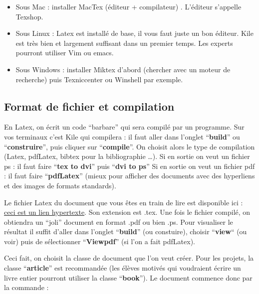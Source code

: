 \documentclass[a4paper,10pt]{article}
\begin{document}
\begin{itemize}
\item Sous Mac : installer MacTex  (éditeur + compilateur) . L'éditeur s'appelle Texshop.  
\item Sous Linux : Latex est installé de base, il vous faut juste un bon éditeur. Kile est très bien et largement suffisant
dans un premier temps. Les experts pourront utiliser Vim ou emacs. 
\item Sous Windows : installer Miktex d'abord (chercher avec un moteur de recherche) puis Texniccenter ou  Winshell par exemple.
\end{itemize}


\subsection{Format de fichier et compilation}





En Latex, on écrit un code ``barbare'' qui sera compil\'e par un programme. Sur vos terminaux c'est Kile qui compilera : il faut aller dans l'onglet ``\textbf{build}'' ou ``\textbf{construire}'', puis cliquer sur ``\textbf{compile}''. On choisit alors le type de compilation (Latex, pdfLatex, bibtex pour la bibliographie \ldots). 
Si en sortie on veut un fichier ps : il faut faire ``\textbf{tex to dvi}'' puis  ``\textbf{dvi to ps}''
Si en sortie on veut un fichier pdf : il faut faire ``\textbf{pdfLatex}'' (mieux pour afficher des documents avec des hyperliens et des images de formats standards).

Le fichier Latex du document que vous êtes en train de lire est  disponible ici : \href{http://people.math.jussieu.fr/~salmon/enseignement/M1/introlatex.tex}{ceci est un lien hypertexte}.  Son extension est  .tex. Une fois le fichier compilé,  on obtiendra un ``joli'' document en format .pdf ou bien .ps. Pour visualiser le résultat il suffit d'aller dans l'onglet  ``\textbf{build}'' (ou constuire), choisir ``\textbf{view}`` (ou voir) puis de sélectionner ``\textbf{Viewpdf}'' (si l'on a fait pdfLatex).\medskip

Ceci fait, on choisit la classe de document  que l'on veut créer.  Pour les projets,  la classe ``\textbf{article}'' est recommandée (les élèves motivés qui voudraient écrire un livre entier pourront utiliser la classe ``\textbf{book}''). Le document commence donc par la commande :\medskip
\end{document}
